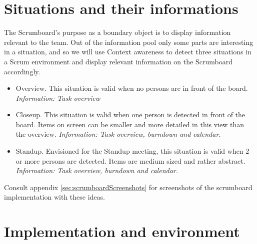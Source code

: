 \documentclass[../report.tex]{subfiles}
\begin{document}








\section{Situations and their informations}
\label{sec:proofSituations}

The Scrumboard's purpose as a boundary object is to display information relevant to the team\cite[V]{Why Scrum works (2011)}. Out of the information pool only some parts are interesting in a situation, and so we will use Context awareness to detect three situations in a Scrum environment and display relevant information on the Scrumboard accordingly.


\begin{itemize}
\item Overview. This situation is valid when no persons are in front of the board.
\subitem \textit{Information: Task overview}

\item Closeup. This situation is valid when one person is detected in front of the board. Items on screen can be smaller and more detailed in this view than the overview.
\subitem \textit{Information: Task overview, burndown and calendar.}

\item Standup. Envisioned for the Standup meeting, this situation is valid when 2 or more persons are detected. Items are medium sized and rather abstract.
\subitem \textit{Information: Task overview, burndown and calendar.}\\
\end{itemize}


Consult appendix \ref{sec:scrumboardScreenshots} for screenshots of the scrumboard implementation with these ideas.



\section{Implementation and environment}
\end{document}
